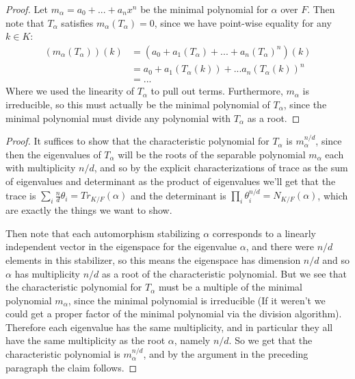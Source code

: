 \documentclass[11pt]{article}
\begin{document}
\begin{proof}
  Let $m_\alpha = a_0 + ... + a_nx^n$ be the minimal polynomial for $\alpha$ over $F$.
  Then note that $T_\alpha$ satisfies $m_\alpha(T_\alpha) = 0$, since we have point-wise equality for any $k \in K$:
  \begin{align*}
    (m_\alpha(T_\alpha))(k)
    &= (a_0 + a_1(T_\alpha) + ... + a_n(T_\alpha)^n)(k) \\
    &= a_0 + a_1(T_\alpha(k)) + ... a_n(T_\alpha(k))^n \\
    &= ...
  \end{align*}
  Where we used the linearity of $T_\alpha$ to pull out terms. Furthermore, $m_\alpha$ is irreducible, so this must actually be the minimal polynomial of $T_\alpha$, since the minimal polynomial must divide any polynomial with $T_\alpha$ as a root.
\end{proof}

\begin{proof}
  It suffices to show that the characteristic polynomial for $T_\alpha$ is $m_\alpha^{n/d}$, since then the eigenvalues of $T_\alpha$ will be the roots of the separable polynomial $m_\alpha$ each with multiplicity $n/d$, and so by the explicit characterizations of trace as the sum of eigenvalues and determinant as the product of eigenvalues we'll get that the trace is $\sum_i \frac{n}{d}\theta_i = Tr_{K/F}(\alpha)$ and the determinant is $\prod_i \theta_i^{n/d} = N_{K/F}(\alpha)$, which are exactly the things we want to show.

  Then note that each automorphism stabilizing $\alpha$ corresponds to a linearly independent vector in the eigenspace for the eigenvalue $\alpha$, and there were $n/d$ elements in this stabilizer, so this means the eigenspace has dimension $n/d$ and so $\alpha$ has multiplicity $n/d$ as a root of the characteristic polynomial.
  But we see that the characteristic polynomial for $T_\alpha$ must be a multiple of the minimal polynomial $m_\alpha$, since the minimal polynomial is irreducible (If it weren't we could get a proper factor of the minimal polynomial via the division algorithm).
  Therefore each eigenvalue has the same multiplicity, and in particular they all have the same multiplicity as the root $\alpha$, namely $n/d$.
  So we get that the characteristic polynomial is $m_\alpha^{n/d}$, and by the argument in the preceding paragraph the claim follows.
\end{proof}
\end{document}
